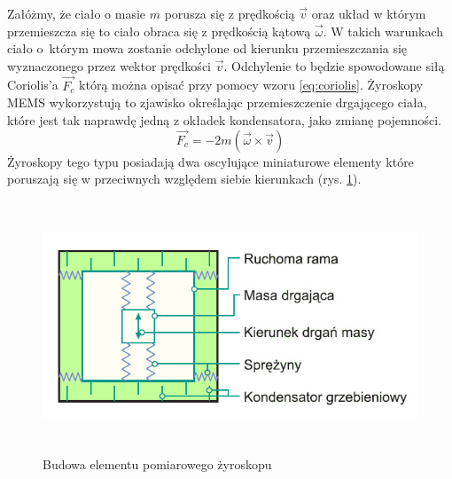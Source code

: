 Załóżmy, że ciało o masie $m$ porusza się z prędkością $\vec{v}$ oraz układ w
którym przemieszcza się to ciało obraca się z prędkością kątową $\vec{\omega}$. W
takich warunkach ciało o~którym mowa zostanie odchylone od kierunku
przemieszczania się wyznaczonego przez wektor prędkości $\vec{v}$. Odchylenie to
będzie spowodowane siłą Coriolis'a $\vec{F_{c}}$ którą można opisać przy pomocy
wzoru \ref{eq:coriolis}. Żyroskopy MEMS wykorzystują to zjawisko określając
przemieszczenie drgającego ciała, które jest tak naprawdę jedną z okładek
kondensatora, jako zmianę pojemności.
\begin{equation}
  \label{eq:coriolis}
  \vec{F_{c}} = -2m \left(\vec{\omega}\times\vec{v}\right)
\end{equation}
\newpage
Żyroskopy tego typu posiadają dwa oscylujące miniaturowe elementy które poruszają się w przeciwnych względem siebie kierunkach (rys. \ref{fig:ZyroOsc}). 
\begin{figure}[!ht]
 \centering
 \includegraphics[height=75mm]{../images/ch04/mems_osc.jpg}
 \caption{Budowa elementu pomiarowego żyroskopu\cite{website::elektronikab2b.pl}}
 \label{fig:ZyroOsc}
\end{figure}

